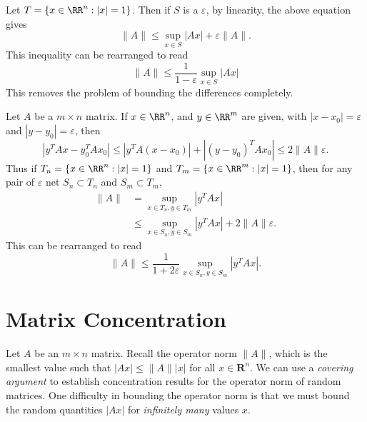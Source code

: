 \begin{example}
	Let $T = \{ x \in \RR^n : |x| = 1 \}$. Then if $S$ is a $\varepsilon$, by linearity, the above equation gives
	\[ \| A \| \leq \sup_{x \in S} |Ax| + \varepsilon \| A \|. \]
	This inequality can be rearranged to read
	\[ \| A \| \leq \frac{1}{1 - \varepsilon} \sup_{x \in S} |Ax| \]
	This removes the problem of bounding the differences completely.
\end{example}

\begin{example}
	Let $A$ be a $m \times n$ matrix. If $x \in \RR^n$, and $y \in \RR^m$ are given, with $|x - x_0| = \varepsilon$ and $|y - y_0| = \varepsilon$, then
	\[ |y^TAx - y_0^TAx_0| \leq |y^TA(x - x_0)| + |(y - y_0)^TAx_0| \leq 2 \| A \| \varepsilon. \]
	Thus if $T_n = \{ x \in \RR^n: |x| = 1 \}$ and $T_m = \{ x \in \RR^m : |x| = 1 \}$, then for any pair of $\varepsilon$ net $S_n \subset T_n$ and $S_m \subset T_m$,
	\begin{align*}
		\| A \| &= \sup_{x \in T_n, y \in T_m} |y^T Ax|\\
		&\leq \sup_{x \in S_n, y \in S_m} |y^T A x| + 2 \| A \| \varepsilon.
	\end{align*}
	This can be rearranged to read
	\[ \| A \| \leq \frac{1}{1 + 2\varepsilon} \sup_{x \in S_n, y \in S_m} |y^T A x|. \]
\end{example}

\section{Matrix Concentration}

Let $A$ be an $m \times n$ matrix. Recall the operator norm $\| A \|$, which is the smallest value such that $|Ax| \leq \| A \| |x|$ for all $x \in \mathbf{R}^n$. We can use a \emph{covering argument} to establish concentration results for the operator norm of random matrices. One difficulty in bounding the operator norm is that we must bound the random quantities $|Ax|$ for \emph{infinitely many} values $x$.

